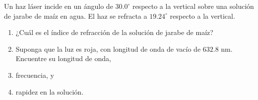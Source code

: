 \item Un haz láser incide en un ángulo de $30.0^\circ$ respecto a la vertical sobre una solución de jarabe de maíz en agua. El haz se refracta a $19.24^\circ$ respecto a la vertical.
\begin{enumerate}
    \item ¿Cuál es el índice de refracción de la solución de jarabe de maíz?
    \item Suponga que la luz es roja, con longitud de onda de vacío de $632.8\text{ nm}$. Encuentre su longitud de onda,
    \item frecuencia, y
    \item rapidez en la solución.
\end{enumerate}